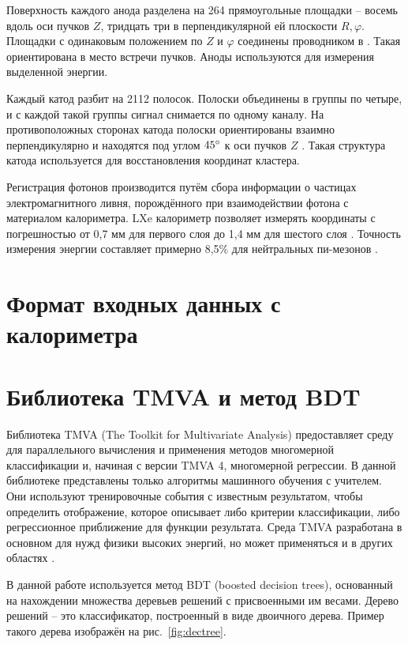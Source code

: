 \documentclass[14pt]{extarticle}
\begin{document}
Поверхность каждого анода разделена на 264 прямоугольные площадки -- восемь вдоль оси пучков $Z$, тридцать три в перпендикулярной ей плоскости $R,\varphi$. Площадки с одинаковым положением по $Z$ и $\varphi$ соединены проводником в . Такая  ориентирована в место встречи пучков. Аноды используются для измерения выделенной энергии.

Каждый катод разбит на 2112 полосок. Полоски объединены в группы по четыре, и с каждой такой группы сигнал снимается по одному каналу. На противоположных сторонах катода полоски ориентированы взаимно перпендикулярно и находятся под углом $45\degree$ к оси пучков $Z$ \cite{shebalin}. Такая структура катода используется для восстановления координат кластера.

Регистрация фотонов производится путём сбора информации о частицах электромагнитного ливня, порождённого при взаимодействии фотона с материалом калориметра. LXe калориметр позволяет измерять координаты с погрешностью от 0,7 мм для первого слоя до 1,4 мм для шестого слоя \cite{Epifanov_2011,lxe_2009}. Точность измерения энергии составляет примерно 8,5\% для нейтральных пи-мезонов \cite{Anisenkov_2014}.
\section{Формат входных данных с калориметра}
\section{Библиотека TMVA и метод BDT}
Библиотека TMVA (The Toolkit for Multivariate Analysis) предоставляет среду для параллельного вычисления и применения методов многомерной классификации и, начиная с версии TMVA 4, многомерной регрессии. В данной библиотеке представлены только алгоритмы машинного обучения с учителем. Они используют тренировочные события с известным результатом, чтобы определить отображение, которое описывает либо критерии классификации, либо регрессионное приближение для функции результата. Среда TMVA разработана в основном для нужд физики высоких энергий, но может применяться и в других областях \cite{tmva4}.

В данной работе используется метод BDT (boosted decision trees), основанный на нахождении множества деревьев решений с присвоенными им весами. Дерево решений -- это классификатор, построенный в виде двоичного дерева. Пример такого дерева изображён на рис.~\ref{fig:dectree}.
\end{document}
